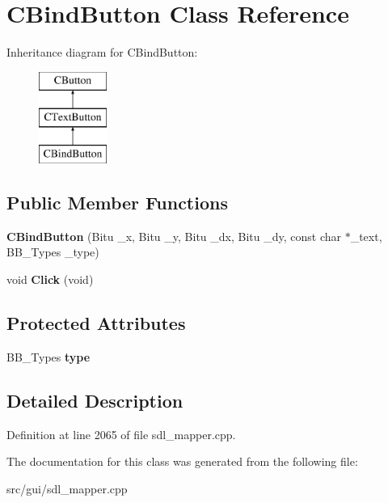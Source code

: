 \hypertarget{classCBindButton}{\section{C\-Bind\-Button Class Reference}
\label{classCBindButton}
}
Inheritance diagram for C\-Bind\-Button\-:\begin{figure}[H]
\begin{center}
\leavevmode
\includegraphics[height=3.000000cm]{classCBindButton}
\end{center}
\end{figure}
\subsection*{Public Member Functions}
\begin{DoxyCompactItemize}
\item 
\hypertarget{classCBindButton_ac88961b71a1666452f4d848f851259d9}{{\bfseries C\-Bind\-Button} (Bitu \-\_\-x, Bitu \-\_\-y, Bitu \-\_\-dx, Bitu \-\_\-dy, const char $\ast$\-\_\-text, B\-B\-\_\-\-Types \-\_\-type)}\label{classCBindButton_ac88961b71a1666452f4d848f851259d9}

\item 
\hypertarget{classCBindButton_a62e84c58b256b4b9f82d6ad1ca32be45}{void {\bfseries Click} (void)}\label{classCBindButton_a62e84c58b256b4b9f82d6ad1ca32be45}

\end{DoxyCompactItemize}
\subsection*{Protected Attributes}
\begin{DoxyCompactItemize}
\item 
\hypertarget{classCBindButton_a6d3fe3711c3f57f5e2ec7a2311408795}{B\-B\-\_\-\-Types {\bfseries type}}\label{classCBindButton_a6d3fe3711c3f57f5e2ec7a2311408795}

\end{DoxyCompactItemize}


\subsection{Detailed Description}


Definition at line 2065 of file sdl\-\_\-mapper.\-cpp.



The documentation for this class was generated from the following file\-:\begin{DoxyCompactItemize}
\item 
src/gui/sdl\-\_\-mapper.\-cpp\end{DoxyCompactItemize}

